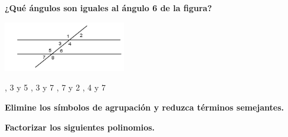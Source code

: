 \documentclass[11pt, addpoints, answers]{exam}
\begin{document}
\begin{questions}
		
		\question[1] \textbf{¿Qué ángulos son iguales al ángulo 6 de la figura?}
		\begin{center}
			\includegraphics[width=0.4\textwidth]{image_243168.png}
		\end{center}
		\begin{choices}
			, 3 y 5
			, 3 y 7
			, 7 y 2
			, 4 y 7
		\end{choices}
		
		
		\question[1] \textbf{Elimine los símbolos de agrupación y reduzca términos semejantes.}  
		
		
		\question[1] \textbf{Factorizar los siguientes polinomios.}  
\end{questions}
\end{document}
